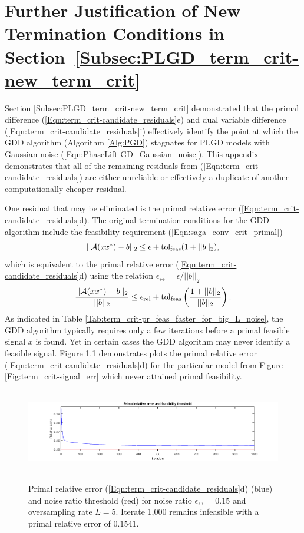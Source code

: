 \chapter{Further Justification of New Termination Conditions in Section~\ref{Subsec:PLGD_term_crit-new_term_crit}}      		\label{Sec:Appx-further_reasons_for_new_term_crit}



Section \ref{Subsec:PLGD_term_crit-new_term_crit} demonstrated that the primal difference (\ref{Eqn:term_crit-candidate_residuals}e) and dual variable difference (\ref{Eqn:term_crit-candidate_residuals}i) effectively identify the point at which the GDD algorithm (Algorithm \ref{Alg:PGD}) stagnates for PLGD models with Gaussian noise (\ref{Eqn:PhaseLift-GD_Gaussian_noise}).  
This appendix demonstrates that all of the remaining residuals from  (\ref{Eqn:term_crit-candidate_residuals}) are either unreliable or effectively a duplicate of another computationally cheaper residual.  

One residual that may be eliminated is the primal relative error (\ref{Eqn:term_crit-candidate_residuals}d).  The original termination conditions for the GDD algorithm include the feasibility requirement (\ref{Eqn:saga_conv_crit_primal}) 
\begin{equation*}
|| {\mathcal A}(xx^*) - b ||_2 \leq \epsilon + \textnormal{tol}_\textnormal{feas} (1 + ||b||_2),
\end{equation*}
which is equivalent to the primal relative error (\ref{Eqn:term_crit-candidate_residuals}d) using the relation $\epsilon_\rel = \epsilon / ||b||_2$
\begin{equation}
	\label{Eqn:GD_new_termination_conds-primal_feas}
\frac{||{\mathcal A}(xx^*) - b||_2}{||b||_2}  \leq \epsilon_{\textnormal{rel}} + \textnormal{tol}_\textnormal{feas} \left(\frac{1 + ||b||_2}{||b||_2}\right).
\end{equation}
As indicated in Table \ref{Tab:term_crit-pr_feas_faster_for_big_L_noise}, the GDD algorithm typically requires only a few iterations before a primal feasible signal $x$ is found.  Yet in certain cases the GDD algorithm may never identify a feasible signal.  Figure \ref{Fig:term_crit-pr_err_fails} demonstrates plots the primal relative error (\ref{Eqn:term_crit-candidate_residuals}d) for the particular model from Figure \ref{Fig:term_crit-signal_err} which never attained primal feasibility.

\begin{figure}[H]
\centering
\hbox{\hspace{-1.0cm} \includegraphics[scale=0.6]{term_crit-pr_err_fails} }
\caption{Primal relative error (\ref{Eqn:term_crit-candidate_residuals}d) (blue) and noise ratio threshold (red) for noise ratio $\epsilon_\rel = 0.15$ and oversampling rate $L = 5$.  Iterate 1,000 remains infeasible with a primal relative error of $0.1541$.}
\label{Fig:term_crit-pr_err_fails}
\end{figure}

